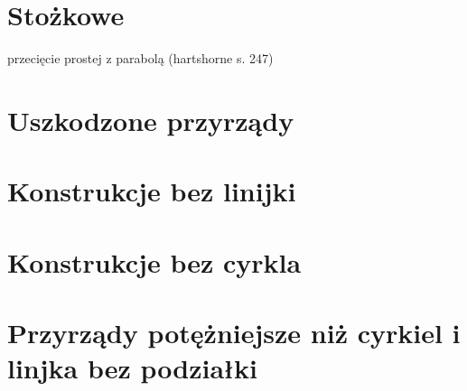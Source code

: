 \section{Stożkowe}
przecięcie prostej z parabolą (hartshorne s. 247)


\section{Uszkodzone przyrządy}


\section{Konstrukcje bez linijki}



\section{Konstrukcje bez cyrkla}




\section{Przyrządy potężniejsze niż cyrkiel i linjka bez podziałki}



